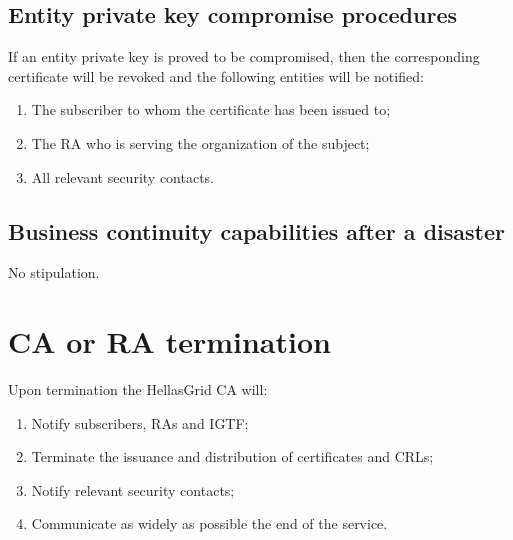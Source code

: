 \subsection{Entity private key compromise procedures}

If an entity private key is proved to be compromised, then the corresponding certificate will be revoked and the following entities will be notified:

\begin{enumerate}
\item{The subscriber to whom the certificate has been issued to;}
\item{The RA who is serving the organization of the subject;}
\item{All relevant security contacts.}
\end{enumerate}

\subsection{Business continuity capabilities after a disaster}

No stipulation.

\section{CA or RA termination}

Upon termination the HellasGrid CA will:

\begin{enumerate}
\item{Notify subscribers, RAs and IGTF;}
\item{Terminate the issuance and distribution of certificates and CRLs;}
\item{Notify relevant security contacts;}
\item{Communicate as widely as possible the end of the service.}
\end{enumerate}

